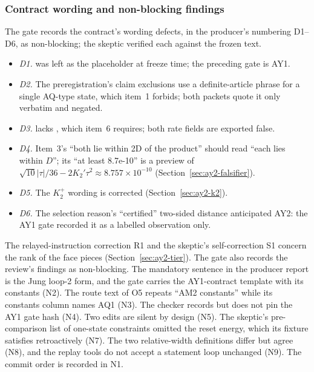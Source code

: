 \subsubsection{Contract wording and non-blocking findings}
\label{sec:ay2-findings}
The gate records the contract's wording defects, in the producer's numbering
D1--D6, as non-blocking; the skeptic verified each against the frozen text.
\begin{itemize}
\item \emph{D1.}  was left as the placeholder
  at freeze time; the preceding gate is AY1.
\item \emph{D2.} The preregistration's claim exclusions use a definite-article
 phrase for a single AQ-type state, which item~1 forbids; both packets quote
 it only verbatim and negated.
\item \emph{D3.}  lacks
 , which item~6 requires; both rate fields are
 exported false.
\item \emph{D4.} Item~3's ``both lie within 2D of the product'' should read
 ``each lies within $D$''; its ``at least 8.7e-10'' is a preview of
 $\sqrt{10}|\tau|/36-2K_2'\tau^2\approx8.757\times10^{-10}$
 (Section~\ref{sec:ay2-falsifier}).
\item \emph{D5.} The $K_2^+$ wording is corrected
 (Section~\ref{sec:ay2-k2}).
\item \emph{D6.} The selection reason's ``certified'' two-sided distance
 anticipated AY2: the AY1 gate recorded it as a labelled observation only.
\end{itemize}
The relayed-instruction correction R1 and the skeptic's self-correction S1
concern the rank of the face pieces (Section~\ref{sec:ay2-tier}). The gate
also records the review's findings as non-blocking. The mandatory sentence in
the producer report is the Jung loop-2 form, and the gate carries the
AY1-contract template with its constants (N2). The route text of O5 repeats
``AM2 constants'' while its constants column names AQ1 (N3). The checker
records but does not pin the AY1 gate hash (N4). Two edits are silent by
design (N5). The skeptic's pre-comparison list of one-state constraints
omitted the reset energy, which its fixture satisfies retroactively (N7). The
two relative-width definitions differ but agree (N8), and the replay tools do
not accept a statement loop unchanged (N9). The commit order is recorded in
N1.

